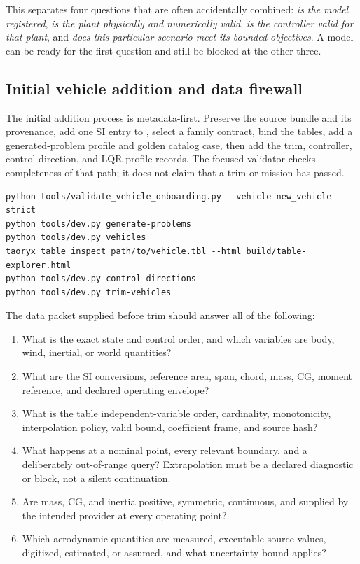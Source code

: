 \documentclass[11pt]{article}
\newcommand{\pathcode}[1]{\path{#1}}
\begin{document}
This separates four questions that are often accidentally combined: \emph{is
the model registered}, \emph{is the plant physically and numerically valid},
\emph{is the controller valid for that plant}, and \emph{does this particular
scenario meet its bounded objectives}. A model can be ready for the first
question and still be blocked at the other three.

\subsection{Initial vehicle addition and data firewall}

The initial addition process is metadata-first. Preserve the source bundle and
its provenance, add one SI entry to
\pathcode{verification/vehicle_models.yaml}, select a family contract, bind
the tables, add a generated-problem profile and golden catalog case, then add
the trim, controller, control-direction, and LQR profile records. The focused
validator checks completeness of that path; it does not claim that a trim or
mission has passed.

\begin{lstlisting}
python tools/validate_vehicle_onboarding.py --vehicle new_vehicle --strict
python tools/dev.py generate-problems
python tools/dev.py vehicles
taoryx table inspect path/to/vehicle.tbl --html build/table-explorer.html
python tools/dev.py control-directions
python tools/dev.py trim-vehicles
\end{lstlisting}

The data packet supplied before trim should answer all of the following:

\begin{enumerate}
  \item What is the exact state and control order, and which variables are
    body, wind, inertial, or world quantities?
  \item What are the SI conversions, reference area, span, chord, mass, CG,
    moment reference, and declared operating envelope?
  \item What is the table independent-variable order, cardinality, monotonicity,
    interpolation policy, valid bound, coefficient frame, and source hash?
  \item What happens at a nominal point, every relevant boundary, and a
    deliberately out-of-range query? Extrapolation must be a declared
    diagnostic or block, not a silent continuation.
  \item Are mass, CG, and inertia positive, symmetric, continuous, and
    supplied by the intended provider at every operating point?
  \item Which aerodynamic quantities are measured, executable-source values,
    digitized, estimated, or assumed, and what uncertainty bound applies?
\end{enumerate}
\end{document}
